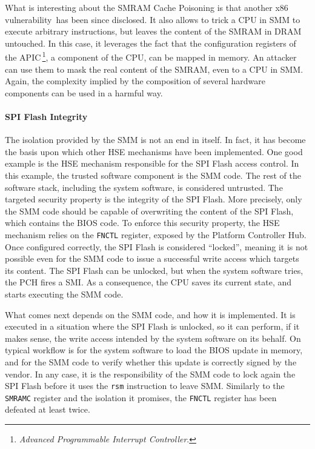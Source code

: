 What is interesting about the SMRAM Cache Poisoning is that another x86
vulnerability\,\cite{domas2015sinkhole} has been since disclosed.
%
It also allows to trick a CPU in SMM to execute arbitrary instructions, but
leaves the content of the SMRAM in DRAM untouched.
%
In this case, it leverages the fact that the configuration registers of the
APIC\,\footnote{\emph{Advanced Programmable Interrupt Controller}.}, a component
of the CPU, can be mapped in memory.
%
An attacker can use them to mask the real content of the SMRAM, even to a CPU in
SMM.
%
Again, the complexity implied by the composition of several hardware components
can be used in a harmful way.


\paragraph{SPI Flash Integrity}
%
The isolation provided by the SMM is not an end in itself.
%
In fact, it has become the basis upon which other HSE mechanisms have been
implemented.
%
One good example is the HSE mechanism responsible for the SPI Flash access
control.
%
In this example, the trusted software component is the SMM code.
%
The rest of the software stack, including the system software, is considered
untrusted.
%
The targeted security property is the integrity of the SPI Flash.
%
More precisely, only the SMM code should be capable of overwriting the content
of the SPI Flash, which contains the BIOS code.
%
To enforce this security property, the HSE mechanism relies on the
\texttt{FNCTL}  register, exposed
by the Platform Controller Hub.
%
Once configured correctly, the SPI Flash is considered ``locked'', meaning it is
not possible even for the SMM code to issue a successful write access which
targets its content.
%
The SPI Flash can be unlocked, but when the system software tries, the PCH fires
a SMI.
%
As a consequence, the CPU saves its current state, and starts executing the SMM
code.

What comes next depends on the SMM code, and how it is implemented.
%
It is executed in a situation where the SPI Flash is unlocked, so it can
perform, if it makes sense, the write access intended by the system software on
its behalf.
%
On typical workflow is for the system software to load the BIOS update in
memory, and for the SMM code to verify whether this update is correctly signed
by the vendor.
%
In any case, it is the responsibility of the SMM code to lock again the SPI
Flash before it uses the \texttt{rsm} instruction to leave SMM.
%
Similarly to the \texttt{SMRAMC} register and the isolation it promises, the
\texttt{FNCTL} register has been defeated at least twice.

